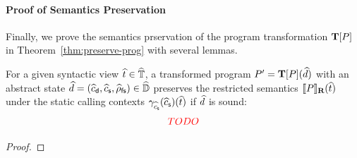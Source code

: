 \paragraph{Proof of Semantics Preservation} Finally, we prove the semantics
prservation of the program transformation $\textbf{T}[P]$ in
Theorem~\ref{thm:preserve-prog} with several lemmas.

\begin{theorem}
  \label{thm:preserve-prog}
  For a given syntactic view $\widehat{t} \in \widehat{\mathbb{T}}$, a transformed program
  $P' = \textbf{T}[P](\widehat{d})$ with an abstract state $\widehat{d} =
  (\widehat{c}_{\textsf{d}}, \widehat{c}_{\textsf{s}}, \widehat{\rho}_{\textsf{fs}}) \in \widehat{\mathbb{D}}$ preserves the restricted semantics
  $\llbracket{P}\rrbracket_\textbf{R}(\widehat{t})$ under the static calling contexts
  $\gamma_{\widehat{c}_{\textsf{s}}}(\widehat{c}_{\textsf{s}})(\widehat{t})$ if $\widehat{d}$ is sound:
  \[
    {\color{red}{TODO}}
  \]
\end{theorem}
\begin{proof}
  \todo
\end{proof}

